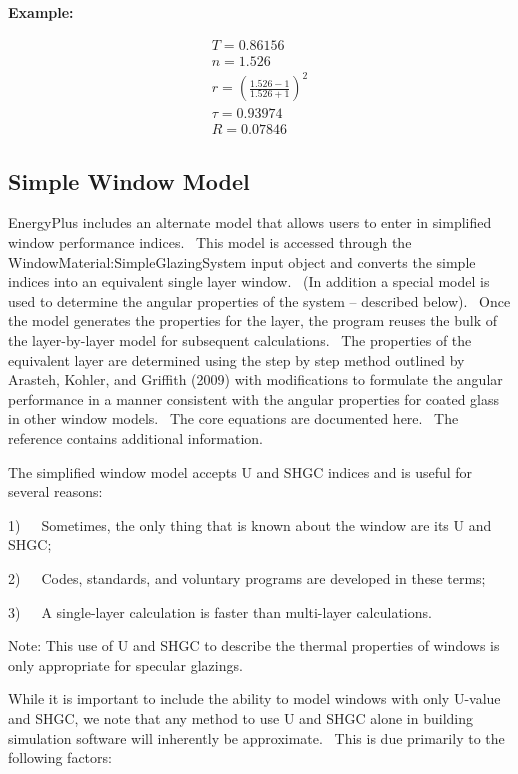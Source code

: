 \textbf{Example:}

\begin{equation}
  \begin{array}{l}
    T = 0.86156 \\
    n = 1.526 \\
    r = \left( \frac{1.526 - 1}{1.526 + 1} \right)^2 \\
    \tau = 0.93974 \\
    R = 0.07846
  \end{array}
\end{equation}

\subsection{Simple Window Model}\label{simple-window-model}

EnergyPlus includes an alternate model that allows users to enter in simplified window performance indices.~ This model is accessed through the WindowMaterial:SimpleGlazingSystem input object and converts the simple indices into an equivalent single layer window.~ (In addition a special model is used to determine the angular properties of the system -- described below).~ Once the model generates the properties for the layer, the program reuses the bulk of the layer-by-layer model for subsequent calculations.~ The properties of the equivalent layer are determined using the step by step method outlined by Arasteh, Kohler, and Griffith (2009) with modifications to formulate the angular performance in a manner consistent with the angular properties for coated glass in other window models.~ The core equations are documented here.~ The reference contains additional information.

The simplified window model accepts U and SHGC indices and is useful for several reasons:

1)~~~Sometimes, the only thing that is known about the window are its U and SHGC;

2)~~~Codes, standards, and voluntary programs are developed in these terms;

3)~~~A single-layer calculation is faster than multi-layer calculations.

Note: This use of U and SHGC to describe the thermal properties of windows is only appropriate for specular glazings.

While it is important to include the ability to model windows with only U-value and SHGC, we note that any method to use U and SHGC alone in building simulation software will inherently be approximate.~ This is due primarily to the following factors:

